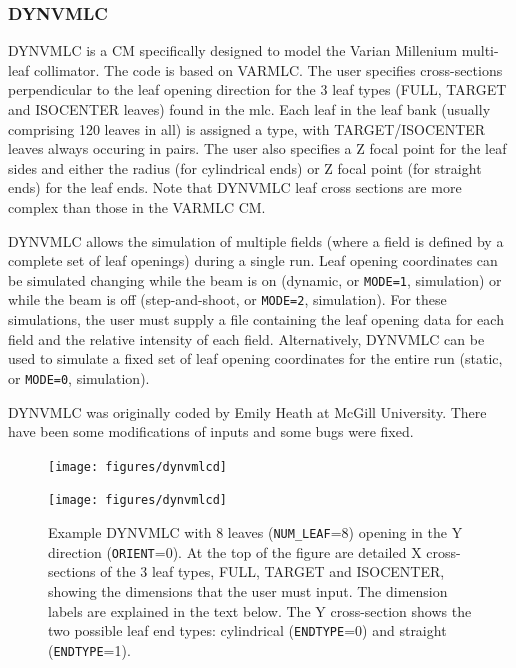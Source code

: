 \documentclass[12pt,twoside]{article}
\begin{document}
\clearpage

\renewcommand{\rightmark}{DYNVMLC CM}
\subsubsection{DYNVMLC}
\label{dynvmlcsect}
DYNVMLC is a CM specifically designed to model the Varian Millenium
multi-leaf collimator.  The code is based on VARMLC.  The user specifies
cross-sections perpendicular to the leaf opening direction for the 3 leaf
types (FULL, TARGET and ISOCENTER leaves) found in the mlc.  Each leaf
in the leaf bank (usually comprising 120 leaves in all) is assigned
a type, with TARGET/ISOCENTER leaves always occuring in pairs.  The user
also specifies a Z focal point for
the leaf sides and either the radius (for cylindrical ends) or Z focal point
(for straight ends)
for the leaf ends. Note that DYNVMLC leaf cross sections are more complex than those in the
VARMLC CM.

DYNVMLC allows the simulation of multiple fields
(where a field is defined by a complete set of leaf openings)
during a single run.  Leaf opening coordinates can be simulated changing
while the beam is on (dynamic, or {\tt MODE=1}, simulation) or while
the beam is off (step-and-shoot, or {\tt MODE=2}, simulation).
For these simulations, the user must supply a file
containing the leaf opening data for each field
and the relative intensity of each field.  Alternatively, DYNVMLC can be
used to simulate a fixed set of leaf opening coordinates for the
entire run (static, or {\tt MODE=0}, simulation).

DYNVMLC was originally coded by Emily Heath at McGill University.
There have been some modifications of inputs and some bugs were
fixed.

\begin{figure}[htpb]
\begin{center}
\vspace*{-0.7cm}
\leavevmode
\begin{latexonly}
\hspace*{-1cm}
\texttt{[image: figures/dynvmlcd]}
\end{latexonly}
\begin{htmlonly}
\texttt{[image: figures/dynvmlcd]}
\end{htmlonly}
\end{center}
\vspace*{-0.7cm}
\caption[DYNVMLC CM geometry]
{Example DYNVMLC with 8 leaves ({\tt NUM\_LEAF}=8) opening in the Y
direction ({\tt ORIENT}=0).  At the top of the figure
are detailed X cross-sections of the
3 leaf types, FULL, TARGET and ISOCENTER, showing the dimensions that the
user must input.  The dimension labels are explained in the text below.
The Y cross-section shows the two possible leaf end types: cylindrical ({\tt ENDTYPE}=0) and
straight ({\tt ENDTYPE}=1).}
\label{dynvmlc_fig}
\end{figure}
\end{document}
